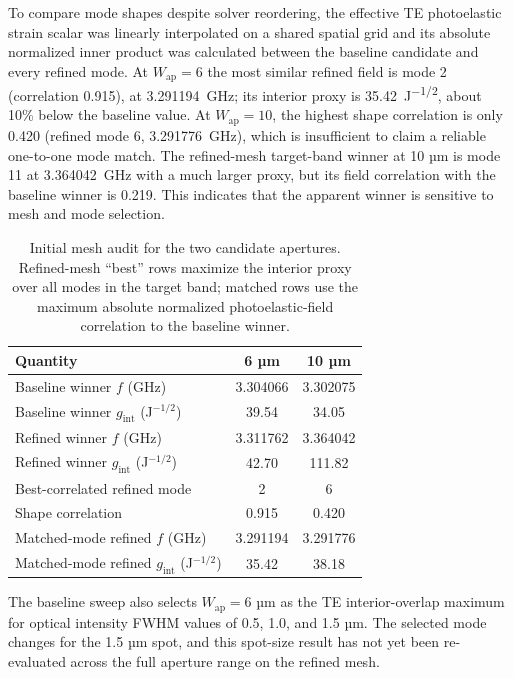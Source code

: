 \documentclass[10pt,twocolumn]{article}
\begin{document}
To compare mode shapes despite solver reordering, the effective TE photoelastic strain scalar was linearly interpolated on a shared spatial grid and its absolute normalized inner product was calculated between the baseline candidate and every refined mode. At $W_{\mathrm{ap}}=6$ the most similar refined field is mode 2 (correlation 0.915), at \SI{3.291194}{\giga\hertz}; its interior proxy is \SI{35.42}{\joule^{-1/2}}, about 10\% below the baseline value. At $W_{\mathrm{ap}}=10$, the highest shape correlation is only 0.420 (refined mode 6, \SI{3.291776}{\giga\hertz}), which is insufficient to claim a reliable one-to-one mode match. The refined-mesh target-band winner at 10 µm is mode 11 at \SI{3.364042}{\giga\hertz} with a much larger proxy, but its field correlation with the baseline winner is 0.219. This indicates that the apparent winner is sensitive to mesh and mode selection.

\begin{table}[t]\centering
\caption{Initial mesh audit for the two candidate apertures. Refined-mesh ``best'' rows maximize the interior proxy over all modes in the target band; matched rows use the maximum absolute normalized photoelastic-field correlation to the baseline winner.}
\label{tab:mesh-audit}
\begin{tabular}{@{}lcc@{}}\toprule
Quantity & 6 µm & 10 µm\\\midrule
Baseline winner $f$ (GHz) & 3.304066 & 3.302075\\
Baseline winner $g_{\mathrm{int}}$ (J$^{-1/2}$) & 39.54 & 34.05\\
Refined winner $f$ (GHz) & 3.311762 & 3.364042\\
Refined winner $g_{\mathrm{int}}$ (J$^{-1/2}$) & 42.70 & 111.82\\
Best-correlated refined mode & 2 & 6\\
Shape correlation & 0.915 & 0.420\\
Matched-mode refined $f$ (GHz) & 3.291194 & 3.291776\\
Matched-mode refined $g_{\mathrm{int}}$ (J$^{-1/2}$) & 35.42 & 38.18\\\bottomrule\end{tabular}\end{table}

The baseline sweep also selects $W_{\mathrm{ap}}=6$ µm as the TE interior-overlap maximum for optical intensity FWHM values of 0.5, 1.0, and 1.5 µm. The selected mode changes for the 1.5 µm spot, and this spot-size result has not yet been re-evaluated across the full aperture range on the refined mesh.
\end{document}
